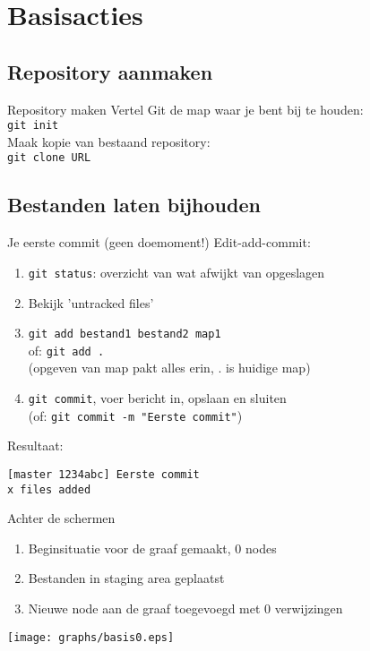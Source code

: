 \section{Basisacties}

\subsection{Repository aanmaken}
\begin{frame}[fragile]{Repository maken}
	Vertel Git de map waar je bent bij te houden:\\

	\texttt{git init}\\

	Maak kopie van bestaand repository:\\

	\texttt{git clone URL}
\end{frame}

\subsection{Bestanden laten bijhouden}
\begin{frame}[fragile]{Je eerste commit (geen doemoment!)}
	Edit-add-commit:
	\begin{enumerate}
		\item \texttt{git status}: overzicht van wat afwijkt van opgeslagen
		\item Bekijk 'untracked files'
		\item \texttt{git add bestand1 bestand2 map1}\\ of:
			\texttt{git add .}\\
			(opgeven van map pakt alles erin, . is huidige map)
		\item \texttt{git commit}, voer bericht in, opslaan en sluiten\\
			(of: \texttt{git commit -m "Eerste commit"})
	\end{enumerate}
	Resultaat:
	\begin{verbatim}
[master 1234abc] Eerste commit
x files added
	\end{verbatim}
\end{frame}

\begin{frame}{Achter de schermen}
	\begin{enumerate}
		\item Beginsituatie voor de graaf gemaakt, 0 nodes
		\item Bestanden in staging area geplaatst
		\item Nieuwe node aan de graaf toegevoegd met 0 verwijzingen
	\end{enumerate}
	\begin{center}
		\texttt{[image: graphs/basis0.eps]}
	\end{center}
\end{frame}


